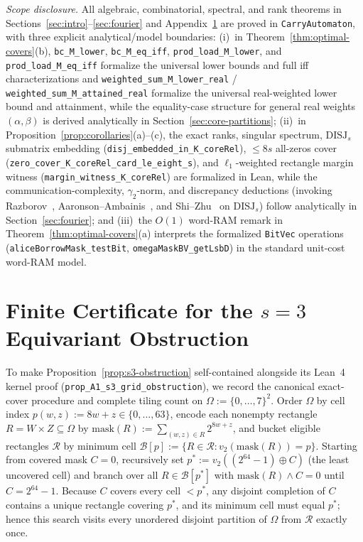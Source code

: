 \documentclass[11pt,reqno]{amsart}
\theoremstyle{definition}
\theoremstyle{remark}
\newcommand{\DISJ}{\mathrm{DISJ}}
\numberwithin{equation}{section}
\begin{document}
\noindent\emph{Scope disclosure.} All algebraic, combinatorial, spectral, and rank theorems in Sections~\ref{sec:intro}--\ref{sec:fourier} and Appendix~\ref{app:s3-cert} are proved in \texttt{CarryAutomaton}, with three explicit analytical/model boundaries: (i)~in Theorem~\ref{thm:optimal-covers}(b), \texttt{bc\_M\_lower}, \texttt{bc\_M\_eq\_iff}, \texttt{prod\_load\_M\_lower}, and \texttt{prod\_load\_M\_eq\_iff} formalize the universal lower bounds and full iff characterizations and \texttt{weighted\_sum\_M\_lower\_real} / \texttt{weighted\_sum\_M\_attained\_real} formalize the universal real-weighted lower bound and attainment, while the equality-case structure for general real weights $(\alpha, \beta)$ is derived analytically in Section~\ref{sec:core-partitions}; (ii)~in Proposition~\ref{prop:corollaries}(a)--(c), the exact ranks, singular spectrum, $\DISJ_s$ submatrix embedding (\texttt{disj\_embedded\_in\_K\_coreRel}), $\le 8s$ all-zeros cover (\texttt{zero\_cover\_K\_coreRel\_card\_le\_eight\_s}), and $\ell_1$-weighted rectangle margin witness (\texttt{margin\_witness\_K\_coreRel}) are formalized in Lean, while the communication-complexity, $\gamma_2$-norm, and discrepancy deductions (invoking Razborov~\cite{Raz92,Raz03}, Aaronson--Ambainis~\cite{AA05}, and Shi--Zhu~\cite{SZ09} on $\DISJ_s$) follow analytically in Section~\ref{sec:fourier}; and (iii)~the $O(1)$ word-RAM remark in Theorem~\ref{thm:optimal-covers}(a) interprets the formalized \texttt{BitVec} operations (\texttt{aliceBorrowMask\_testBit}, \texttt{omegaMaskBV\_getLsbD}) in the standard unit-cost word-RAM model.

\appendix

\section{Finite Certificate for the \texorpdfstring{$s = 3$}{s = 3} Equivariant Obstruction}
\label{app:s3-cert}

To make Proposition~\ref{prop:s3-obstruction} self-contained alongside its Lean~4 kernel proof (\texttt{prop\_A1\_s3\_grid\_obstruction}), we record the canonical exact-cover procedure and complete tiling count on $\Omega := \{0, \dots, 7\}^2$. Order $\Omega$ by cell index $p(w, z) := 8w + z \in \{0, \dots, 63\}$, encode each nonempty rectangle $R = W \times Z \subseteq \Omega$ by $\mathrm{mask}(R) := \sum_{(w,z) \in R} 2^{8w + z}$, and bucket eligible rectangles $\mathcal{R}$ by minimum cell $\mathcal{B}[p] := \{R \in \mathcal{R} : v_2(\mathrm{mask}(R)) = p\}$. Starting from covered mask $C = 0$, recursively set $p^* := v_2((2^{64} - 1) \oplus C)$ (the least uncovered cell) and branch over all $R \in \mathcal{B}[p^*]$ with $\mathrm{mask}(R) \land C = 0$ until $C = 2^{64} - 1$. Because $C$ covers every cell $< p^*$, any disjoint completion of $C$ contains a unique rectangle covering $p^*$, and its minimum cell must equal $p^*$; hence this search visits every unordered disjoint partition of $\Omega$ from $\mathcal{R}$ exactly once.
\end{document}
